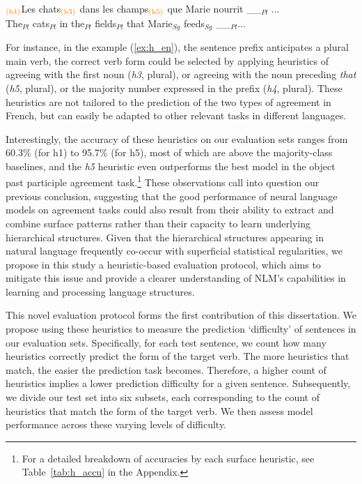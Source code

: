 \begin{exe}
    \ex \label{ex:h_en} 
    \gll $_{\textrm{\textcolor{orange}{(h4)}}}$Les chats$_{\textrm{\textcolor{orange}{(h3)}}}$ dans les champs$_{\textrm{\textcolor{orange}{(h5)}}}$ que Marie nourrit \_\_$_{Pl}$ ... \\ 
    {\small \phantom{()}The$_{Pl}$} {\small cats$_{Pl}$} {\small in} {\small the$_{Pl}$} {\small fields$_{Pl}$} {\small that} {\small Marie$_{Sg}$} {\small feeds$_{Sg}$} {\small \_\_$_{Pl}$...} \\
\end{exe}
For instance, in the example (\ref{ex:h_en}), the sentence prefix anticipates a plural main verb, the correct verb form could be selected by applying heuristics of agreeing with the first noun (\emph{h3}, plural), or agreeing with the noun preceding \emph{that} (\emph{h5}, plural), or the majority number expressed in the prefix (\emph{h4}, plural). These heuristics are not tailored to the prediction of the two types of agreement in French, but can easily be adapted to other
relevant tasks in different languages. 


 Interestingly, the accuracy of these heuristics on our evaluation sets ranges from 60.3\% (for h1) to
95.7\% (for h5), most of which are above the majority-class baselines, and the \emph{h5} heuristic even outperforms the best model in the object past participle agreement task.\footnote{For a detailed breakdown of accuracies by each surface heuristic, see Table~\ref{tab:h_accu} in the Appendix.} These observations call into question our previous conclusion, suggesting that the good performance of neural language models on agreement tasks could also result from their ability to extract and combine surface patterns rather than their capacity to learn underlying hierarchical structures. Given that the hierarchical structures appearing in natural language frequently co-occur with superficial statistical regularities, we propose in this study a heuristic-based evaluation protocol, which aims to mitigate this issue and  provide a clearer understanding of NLM's capabilities in learning and processing language structures.

This novel evaluation protocol forms the first contribution of this dissertation. We propose using these heuristics
to measure the prediction `difficulty' of sentences in our evaluation sets. Specifically, for each test sentence, we count how many heuristics correctly predict the form of the target verb. The more heuristics that match, the easier the prediction task becomes. Therefore, a higher count of heuristics implies a lower prediction difficulty for a given sentence. Subsequently, we divide our test set into six subsets, each corresponding to the count of heuristics that match the form of the target verb. We then assess model performance across these varying levels of difficulty. 

